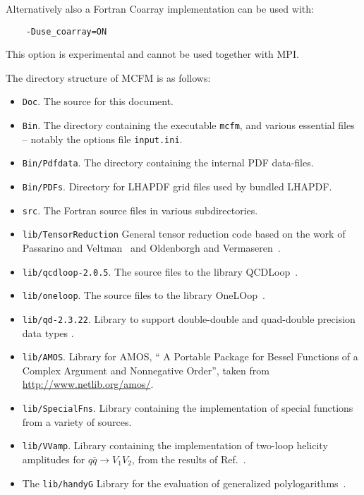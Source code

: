  Alternatively also a Fortran Coarray implementation can be used with: 
 \begin{verbatim}
 	-Duse_coarray=ON
 \end{verbatim} 
 This option is experimental and cannot be used together with MPI.
 
 The directory structure of MCFM is as follows:
 \begin{itemize}
 	\item {\tt Doc}. The source for this document.
 	\item {\tt Bin}.
 	The directory containing the executable {\tt mcfm}, and various essential files -- notably the 
 	options file {\tt input.ini}.
 	\item {\tt Bin/Pdfdata}.
 	The directory containing the internal PDF data-files.
 	\item {\tt Bin/PDFs}.
 	Directory for LHAPDF grid files used by bundled LHAPDF.
 	\item {\tt src}.
 	The Fortran source files in various subdirectories.
 	\item {\tt lib/TensorReduction}
 	General tensor reduction code based on the work of Passarino and Veltman~\cite{Passarino:1978jh}
 	and Oldenborgh and Vermaseren~\cite{vanOldenborgh:1989wn}.
 	\item {\tt lib/qcdloop-2.0.5}.
 	The source files to the library QCDLoop~\cite{Carrazza:2016gav,Ellis:2007qk}.
 	\item {\tt lib/oneloop}.
 	The source files to the library OneLOop~\cite{vanHameren:2010cp}.
 	\item {\tt lib/qd-2.3.22}.
 	Library to support double-double and quad-double precision data types \cite{libqd}.
 	\item {\tt lib/AMOS}.
 	Library for AMOS, `` A Portable Package for Bessel Functions of a Complex Argument and 
 	Nonnegative Order'', taken from
 	\href{http://www.netlib.org/amos/}{http://www.netlib.org/amos/}.
 	\item {\tt lib/SpecialFns}.
 	Library containing the implementation of special functions from a variety of sources.
 	\item {\tt lib/VVamp}.
 	Library containing the implementation of two-loop helicity
 	amplitudes for $q\bar q \to V_1 V_2$, from the results of Ref.~\cite{Gehrmann:2015ora}.
 	\item The {\tt lib/handyG}
 	Library for the evaluation of generalized polylogarithms~\cite{Naterop:2019xaf}.
 	\end{itemize}
 
